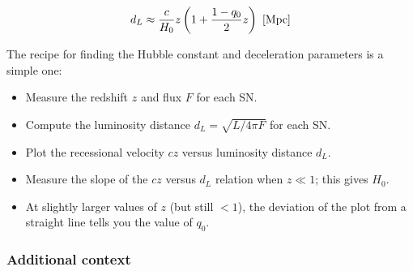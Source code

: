 \documentclass[a4paper,11pt]{article}
\begin{document}
\begin{align*}
    d_L \approx \frac{c}{H_0}z \left(1+\frac{1-q_0}{2}z\right) ~ [{\rm Mpc}]
\end{align*}

{\noindent}The recipe for finding the Hubble constant and deceleration parameters is a simple one:

\begin{itemize}
    \item Measure the redshift $z$ and flux $F$ for each SN.
    \item Compute the luminosity distance $d_L=\sqrt{L/4\pi F}$ for each SN.
    \item Plot the recessional velocity $cz$ versus luminosity distance $d_L$.
    \item Measure the slope of the $cz$ versus $d_L$ relation when $z\ll1$; this gives $H_0$.
    \item At slightly larger values of $z$ (but still $<1$), the deviation of the plot from a straight line tells you the value of $q_0$.
\end{itemize}

\subsubsection{Additional context}
\end{document}
